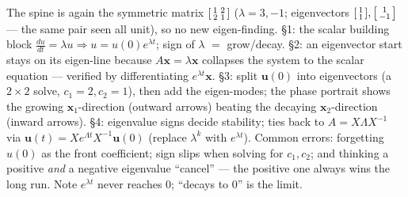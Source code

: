\documentclass[10pt]{article}
\newcommand{\uu}{\mathbf{u}}
\newcommand{\xx}{\mathbf{x}}
\begin{document}
\begin{teachernote}
The spine is again the symmetric matrix $\begin{bsmallmatrix}1&2\\2&1\end{bsmallmatrix}$ ($\lambda=3,-1$;
eigenvectors $\begin{bsmallmatrix}1\\1\end{bsmallmatrix},\begin{bsmallmatrix}1\\-1\end{bsmallmatrix}$ --- the same
pair seen all unit), so no new eigen-finding. \S1: the scalar building block $\frac{du}{dt}=\lambda u\Rightarrow
u=u(0)e^{\lambda t}$; sign of $\lambda$ $=$ grow/decay. \S2: an eigenvector start stays on its eigen-line
because $A\xx=\lambda\xx$ collapses the system to the scalar equation --- verified by differentiating
$e^{\lambda t}\xx$. \S3: split $\uu(0)$ into eigenvectors (a $2\times2$ solve, $c_1=2,c_2=1$), then add the
eigen-modes; the phase portrait shows the growing $\xx_1$-direction (outward arrows) beating the decaying
$\xx_2$-direction (inward arrows). \S4: eigenvalue signs decide stability; ties back to $A=X\Lambda X^{-1}$
via $\uu(t)=Xe^{\Lambda t}X^{-1}\uu(0)$ (replace $\lambda^k$ with $e^{\lambda t}$). Common errors: forgetting
$u(0)$ as the front coefficient; sign slips when solving for $c_1,c_2$; and thinking a positive \emph{and} a
negative eigenvalue ``cancel'' --- the positive one always wins the long run. Note $e^{\lambda t}$ never
reaches $0$; ``decays to $0$'' is the limit.
\end{teachernote}
\end{document}
